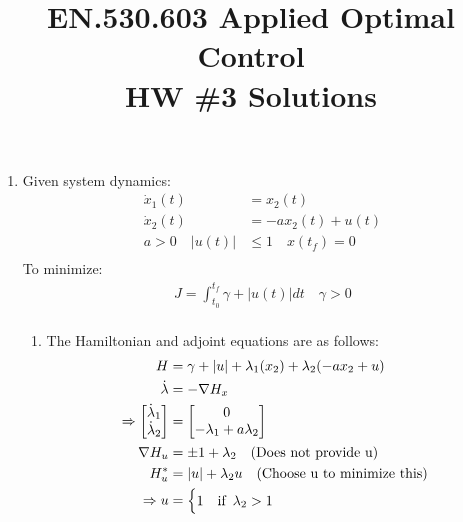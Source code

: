
\title{EN.530.603 Applied Optimal Control \\HW \#3 Solutions}
\graphicspath{{./figures/}}

\maketitle

\begin{enumerate}

  \item Given system dynamics:
  \begin{align*}
   \dot x_1(t) &= x_2(t)\\
   \dot x_2(t) &= -a x_2(t) + u(t) \\
   a > 0 \quad |u(t)| &\le 1 \quad x(t_f) = 0\\
  \end{align*}
  To minimize:
  \begin{align*}
   J = \int_{t_0}^{t_f} \gamma + |u(t)| dt \quad \gamma > 0\\
  \end{align*}
  \begin{enumerate}
   \item The Hamiltonian and adjoint equations are as follows:
   \begin{align*}
    H &= \gamma + |u| + \lambda_1 ( x_2) + \lambda_2 (-a x_2 + u)\\
    \dot \lambda &= -\nabla H_x\\
    \Rightarrow \begin{bmatrix}
                 \dot \lambda_1\\
                 \dot \lambda_2\\
                \end{bmatrix} &= 
                \begin{bmatrix}
                 0 \\
                 -\lambda_1 + a \lambda_2\\
                \end{bmatrix}\\
    \nabla H_u &= \pm 1 + \lambda_2 \quad \text{(Does not provide u)}\\
    H^*_u &= |u| + \lambda_2 u \quad \text{(Choose u to minimize this)}\\
    \Rightarrow u &= \begin{cases}
                      1 & \mbox{if}\enskip \lambda_2 > 1\\

\end{cases}
\end{align*}
\end{enumerate}
\end{enumerate}

